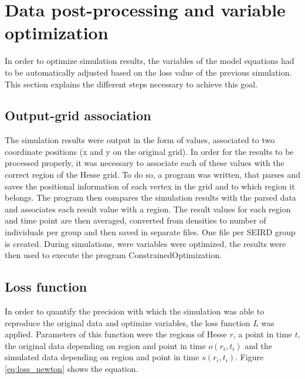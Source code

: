 \section{Data post-processing and variable optimization}
\label{sec:post_proc}
In order to optimize simulation results, the variables of the model equations had to be automatically adjusted based on
the loss value of the previous simulation. This section explains the different steps necessary to achieve this goal.

\subsection{Output-grid association}
The simulation results were output in the form of values, associated to two coordinate positions (x and y on the
original grid). In order for the results to be processed properly, it was necessary to associate each of these
values with the correct region of the Hesse grid. To do so, a program was written, that parses and saves the positional
information of each vertex in the grid and to which region it belongs. The program then compares the simulation results
with the parsed data and associates each result value with a region. The result values for each region and time point
are then averaged, converted from densities to number of individuals per group and then saved in separate files.
One file per SEIRD group is created. During simulations, were variables were optimized, the results were then used to
execute the program ConstrainedOptimization.


\subsection{Loss function}
In order to quantify the precision with which the simulation was able to reproduce the original data and optimize variables, the loss function $L$
was applied. Parameters of this function were the regions of Hesse $r$, a point in time $t$, the original data depending on
region and point in time $o(r_i,t_i)$ and the simulated data depending on region and point in time $s(r_i, t_i)$. Figure \ref*{eq:loss_newton}
shows the equation.

